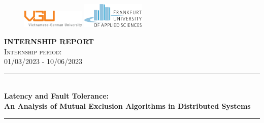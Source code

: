 \begin{titlepage}

\newcommand{\HRule}{\rule{\linewidth}{0.5mm}} %

\begin{figure}
    \centering
    \includegraphics[width=3cm]{./title/Logo20.png}
    \hspace{0.5cm}
    \includegraphics[width=3cm]{./title/fra_uas_logo.png}
\end{figure}


\vspace*{1cm}

 

\center %



\textsc{\LARGE \bfseries INTERNSHIP REPORT}\\[1.5cm] 
\textsc{\Large Internship period:}\\[0.2cm]
\textsc{\large 01/03/2023 - 10/06/2023}\\[0.5cm] 

\makeatletter
\HRule \\[0.3cm]
{ \huge \bfseries Latency and Fault Tolerance:\\
  An Analysis of Mutual Exclusion
Algorithms in Distributed Systems}\\[0.2cm] %
\HRule \\[1.5cm]
 

\end{titlepage}
